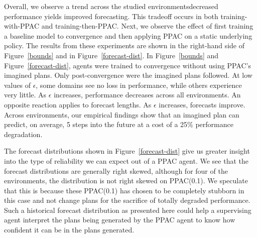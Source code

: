 \documentclass{article}
\newcommand{\JC}[1] {{\color{blue} \textbf{[JC]: #1}}}
\begin{document}
            Overall, we observe a trend across the studied environments\textemdash decreased performance yields improved forecasting. This tradeoff occurs in both training-with-PPAC and training-then-PPAC. Next, we observe the effect of first training a baseline model to convergence and then applying PPAC on a static underlying policy. The results from these experiments are shown in the right-hand side of Figure~\ref{bounds} and in Figure~\ref{forecast-dist}. In Figure~\ref{bounds} and Figure~\ref{forecast-dist}, agents were trained to convergence without using PPAC's imagined plans. Only post-convergence were the imagined plans followed. At low values of $\epsilon$, some domains see no loss in performance, while others experience very little. As $\epsilon$ increases, performance decreases across all environments. An opposite reaction applies to forecast lengths. As $\epsilon$ increases, forecasts improve. Across environments, our empirical findings show that an imagined plan can predict, on average, 5 steps into the future at a cost of a 25\% performance degradation.

            The forecast distributions shown in Figure~\ref{forecast-dist} give us greater insight into the type of reliability we can expect out of a PPAC agent. We see that the forecast distributions are generally right skewed, although for four of the environments, the distribution is not right skewed on PPAC(0.1). We speculate that this is because these PPAC(0.1) has chosen to be completely stubborn in this case and not change plans for the sacrifice of totally degraded performance. Such a historical forecast distribution as presented here could help a supervising agent interpret the plans being generated by the PPAC agent to know how confident it can be in the plans generated.




\end{document}
